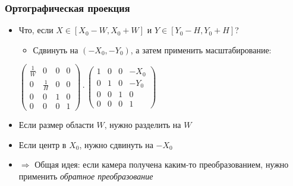 \documentclass[10pt]{beamer}
\begin{document}
\begin{frame}[fragile]
\frametitle{Ортографическая проекция}
\begin{itemize}
\item Что, если \begin{math}X \in [X_0 - W, X_0 + W]\end{math} и \begin{math}Y \in [Y_0 - H, Y_0 + H]\end{math}?
\pause
\begin{itemize}
\item Сдвинуть на \begin{math}(-X_0, -Y_0)\end{math}, а затем применить масштабирование:
\end{itemize}
\begin{center}
\begin{math}
\begin{pmatrix}
\frac{1}{W} & 0 & 0 & 0 \\
0 & \frac{1}{H} & 0 & 0 \\
0 & 0 & 1 & 0 \\
0 & 0 & 0 & 1
\end{pmatrix}
\cdot
\begin{pmatrix}
1 & 0 & 0 & -X_0 \\
0 & 1 & 0 & -Y_0 \\
0 & 0 & 1 & 0 \\
0 & 0 & 0 & 1
\end{pmatrix}
\end{math}
\end{center}
\pause
\item Если размер области \begin{math}W\end{math}, нужно разделить на \begin{math}W\end{math}
\pause
\item Если центр в \begin{math}X_0\end{math}, нужно сдвинуть на \begin{math}-X_0\end{math}
\pause
\item \begin{math}\Longrightarrow\end{math} Общая идея: если камера получена каким-то преобразованием, нужно применить \textit{обратное преобразование}
\end{itemize}
\end{frame}
\end{document}
